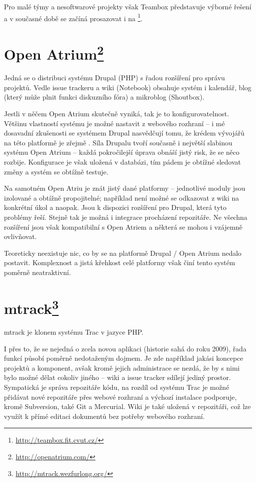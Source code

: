 \documentclass[thesis=B,czech]{FITthesis}[2012/05/02]
\begin{document}
Pro malé týmy a nesoftwarové projekty však Teambox představuje výborné řešení a v
současné době se začíná prosazovat i na \footnote{\url{http://teambox.fit.cvut.cz/}}.

\section[Open Atrium]{Open Atrium\footnote{\url{http://openatrium.com/}}}

Jedná se o distribuci systému Drupal (PHP) s řadou rozšíření pro správu
projektů. Vedle issue trackeru a wiki (Notebook) obsahuje systém i
kalendář, blog (který může plnit funkci diskuzního fóra) a
\gls{mikroblog} (Shoutbox).

Jestli v něčem Open Atrium skutečně vyniká, tak je to
konfigurovatelnost. Většinu vlastností systému je možné nastavit
z webového rozhraní -- i mé dosavadní zkušenosti se systémem Drupal
nasvědčují tomu, že krédem vývojářů na této platformě je zřejmě
. Síla Drupalu tvoří současně i největší
slabinou systému Open Atrium -- každá pokročilejší úprava obnáší jistý
risk, že se něco rozbije. Konfigurace je však uložená v databázi, tím
pádem je obtížné sledovat změny a systém se obtížně testuje.

Na samotném Open Atriu je znát jistý  dané platformy --
jednotlivé moduly jsou izolované a obtížně propojitelné; například není
možné se odkazovat z wiki na konkrétní úkol a naopak. Jsou k dispozici
rozšíření pro Drupal, která tyto problémy řeší. Stejně tak je možná i
integrace procházení repozitáře. Ne všechna rozšíření jsou však
kompatibilní s Open Atriem a některá se mohou i vzájemně
ovlivňovat.

Teoreticky neexistuje nic, co by se na platformě Drupal / Open Atrium nedalo
postavit. Komplexnost a jistá křehkost celé platformy však činí tento
systém poměrně neatraktivní.

\section[mtrack]{mtrack\footnote{\url{http://mtrack.wezfurlong.org/}}}

mtrack je klonem systému Trac v jazyce PHP.

I přes to, že se nejedná o zcela novou aplikaci (historie sahá do roku
2009), řada funkcí působí poměrně nedotaženým dojmem. Je zde například
jakási koncepce projektů a komponent, avšak kromě jejich administrace se
nezdá, že by s nimi bylo možné dělat cokoliv jiného -- wiki a issue
tracker sdílejí jediný prostor. Sympatická je správa repozitáře kódu,
na rozdíl od systému Trac je možné přidávat nové repozitáře přes webové
rozhraní a výchozí instalace podporuje, kromě Subversion, také Git a
Mercurial. Wiki je také uložená v repozitáři, což lze využít k přímé
editaci dokumentů bez potřeby webového rozhraní.
\end{document}
